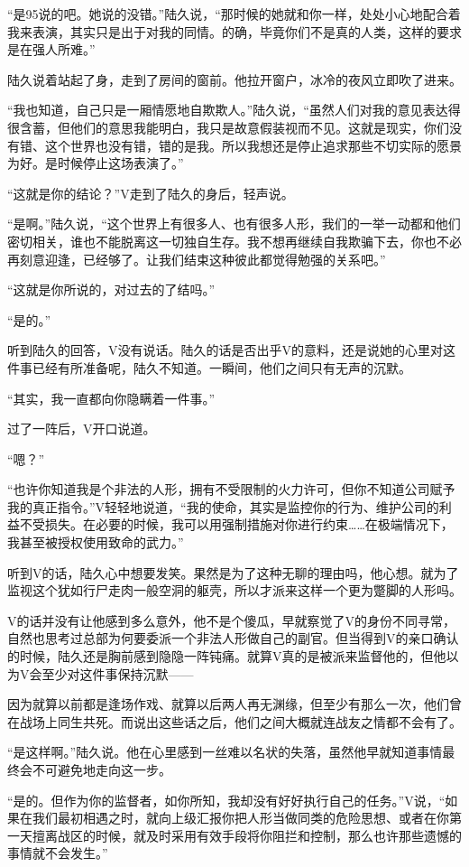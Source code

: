 “是95说的吧。她说的没错。”陆久说，“那时候的她就和你一样，处处小心地配合着我来表演，其实只是出于对我的同情。的确，毕竟你们不是真的人类，这样的要求是在强人所难。”

陆久说着站起了身，走到了房间的窗前。他拉开窗户，冰冷的夜风立即吹了进来。

“我也知道，自己只是一厢情愿地自欺欺人。”陆久说，“虽然人们对我的意见表达得很含蓄，但他们的意思我能明白，我只是故意假装视而不见。这就是现实，你们没有错、这个世界也没有错，错的是我。所以我想还是停止追求那些不切实际的愿景为好。是时候停止这场表演了。”

“这就是你的结论？”V走到了陆久的身后，轻声说。

“是啊。”陆久说，“这个世界上有很多人、也有很多人形，我们的一举一动都和他们密切相关，谁也不能脱离这一切独自生存。我不想再继续自我欺骗下去，你也不必再刻意迎逢，已经够了。让我们结束这种彼此都觉得勉强的关系吧。”

“这就是你所说的，对过去的了结吗。”

“是的。”

听到陆久的回答，V没有说话。陆久的话是否出乎V的意料，还是说她的心里对这件事已经有所准备呢，陆久不知道。一瞬间，他们之间只有无声的沉默。

“其实，我一直都向你隐瞒着一件事。”

过了一阵后，V开口说道。 

“嗯？”

“也许你知道我是个非法的人形，拥有不受限制的火力许可，但你不知道公司赋予我的真正指令。”V轻轻地说道，“我的使命，其实是监控你的行为、维护公司的利益不受损失。在必要的时候，我可以用强制措施对你进行约束……在极端情况下，我甚至被授权使用致命的武力。”

听到V的话，陆久心中想要发笑。果然是为了这种无聊的理由吗，他心想。就为了监视这个犹如行尸走肉一般空洞的躯壳，所以才派来这样一个更为蹩脚的人形吗。

V的话并没有让他感到多么意外，他不是个傻瓜，早就察觉了V的身份不同寻常，自然也思考过总部为何要委派一个非法人形做自己的副官。但当得到V的亲口确认的时候，陆久还是胸前感到隐隐一阵钝痛。就算V真的是被派来监督他的，但他以为V会至少对这件事保持沉默——

因为就算以前都是逢场作戏、就算以后两人再无渊缘，但至少有那么一次，他们曾在战场上同生共死。而说出这些话之后，他们之间大概就连战友之情都不会有了。

“是这样啊。”陆久说。他在心里感到一丝难以名状的失落，虽然他早就知道事情最终会不可避免地走向这一步。

“是的。但作为你的监督者，如你所知，我却没有好好执行自己的任务。”V说，“如果在我们最初相遇之时，就向上级汇报你把人形当做同类的危险思想、或者在你第一天擅离战区的时候，就及时采用有效手段将你阻拦和控制，那么也许那些遗憾的事情就不会发生。”

